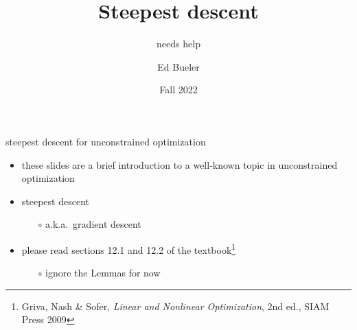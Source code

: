 \documentclass[10pt,hyperref]{beamer}
\title{Steepest descent}
\subtitle{needs help}
\author{Ed Bueler}
\institute[MATH 661]{MATH 661 Optimization}
\date{Fall 2022}
\begin{document}
\beamertemplatenavigationsymbolsempty

\begin{frame}
  \maketitle
\end{frame}


\begin{frame}{steepest descent for unconstrained optimization}

\begin{itemize}
\item these slides are a brief introduction to a well-known topic in unconstrained optimization
\item \alert{steepest descent}
    \begin{itemize}
    \item[$\circ$] a.k.a.~gradient descent
    \end{itemize}
\item please read sections 12.1 and 12.2 of the textbook\footnote{Griva, Nash \& Sofer, \emph{Linear and Nonlinear Optimization}, 2nd ed., SIAM Press 2009}
    \begin{itemize}
    \item[$\circ$] ignore the Lemmas for now
    \end{itemize}
\end{itemize}
\end{frame}
\end{document}

